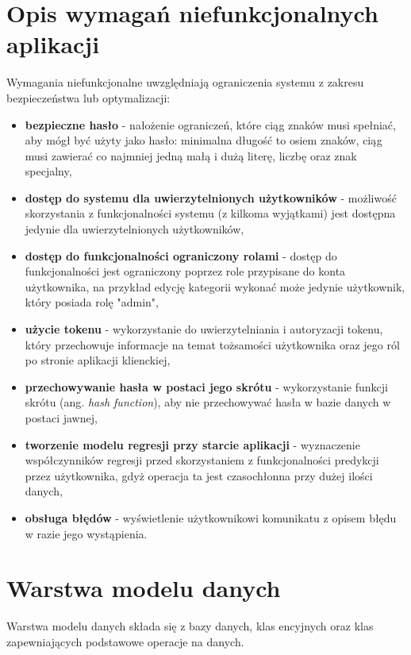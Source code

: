 \section{Opis wymagań niefunkcjonalnych aplikacji}
Wymagania niefunkcjonalne uwzględniają ograniczenia systemu z zakresu bezpieczeństwa lub optymalizacji:
\begin{itemize}
	\item\textbf{bezpieczne hasło} - nałożenie ograniczeń, które ciąg znaków musi spełniać, aby mógł być użyty jako hasło: minimalna długość to osiem znaków, ciąg musi zawierać co najmniej jedną małą i dużą literę, liczbę oraz znak specjalny,
	\item\textbf{dostęp do systemu dla uwierzytelnionych użytkowników} - możliwość skorzystania z funkcjonalności systemu (z kilkoma wyjątkami) jest dostępna jedynie dla uwierzytelnionych użytkowników,
	\item\textbf{dostęp do funkcjonalności ograniczony rolami} - dostęp do funkcjonalności jest ograniczony poprzez role przypisane do konta użytkownika, na przykład edycję kategorii wykonać może jedynie użytkownik, który posiada rolę "admin",
	\item\textbf{użycie tokenu} - wykorzystanie do uwierzytelniania i autoryzacji tokenu, który przechowuje informacje na temat tożsamości użytkownika oraz jego ról po stronie aplikacji klienckiej,
	\item\textbf{przechowywanie hasła w postaci jego skrótu} - wykorzystanie funkcji skrótu (ang. \textit{hash function}), aby nie przechowywać hasła w bazie danych w postaci jawnej,
	\item\textbf{tworzenie modelu regresji przy starcie aplikacji} - wyznaczenie współczynników regresji przed skorzystaniem z funkcjonalności predykcji przez użytkownika, gdyż operacja ta jest czasochłonna przy dużej ilości danych,
	\item\textbf{obsługa błędów} - wyświetlenie użytkownikowi komunikatu z opisem błędu w razie jego wystąpienia.
\end{itemize}
\section{Warstwa modelu danych}
Warstwa modelu danych składa się z bazy danych, klas encyjnych oraz klas zapewniających podstawowe operacje na danych.

